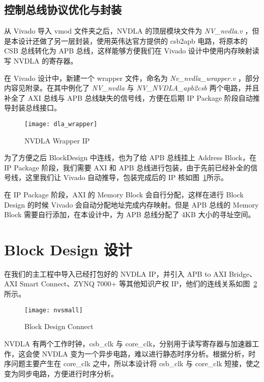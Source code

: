 \subsection{控制总线协议优化与封装}

从 Vivado 导入 vmod 文件夹之后，NVDLA 的顶层模块文件为 \emph{NV\_nvdla.v} ，但是本设计还做了另一层封装，使用英伟达官方提供的 csb2apb 电路，将原本的 CSB 总线转化为 APB 总线，这样能够方便我们在 Vivado 设计中使用内存映射读写 NVDLA 的寄存器。

在 Vivado 设计中，新建一个 wrapper 文件，命名为 \emph{Nv\_nvdla\_wrapper.v} ，部分内容见附录。在其中例化了 \emph{NV\_nvdla} 与 \emph{NV\_NVDLA\_apb2csb} 两个电路，并且补全了 AXI 总线与 APB 总线缺失的信号线，方便在后期 IP Package 阶段自动推导封装总线接口。

\begin{figure}[!htbp]
    \centering
    \texttt{[image: dla\_wrapper]}
    \caption{NVDLA Wrapper IP}
    \label{fig:NVDLA Wrapper}
\end{figure}

为了方便之后 BlockDesign 中连线，也为了给 APB 总线挂上 Address Block，在 IP Package 阶段，我们需要 AXI 和 APB 总线进行包装，由于先前已经补全的信号线，这里我们让 Vivado 自动推导，包装完成后的 IP 核如图~\ref{fig:NVDLA Wrapper}所示。

在 IP Package 阶段，AXI 的 Memory Block 会自行分配，这样在进行 Block Design 的时候 Vivado 会自动分配地址完成内存映射。但是 APB 总线的 Memory Block 需要自行添加，在本设计中，为 APB 总线分配了 4KB 大小的寻址空间。

\section{Block Design 设计}

在我们的主工程中导入已经打包好的 NVDLA IP，并引入 APB to AXI Bridge、AXI Smart Connect、ZYNQ 7000+ 等其他知识产权 IP，他们的连线关系如图~\ref{fig:Block Design Connect}所示。

\begin{figure}[!htbp]
    \centering
    \texttt{[image: nvsmall]}
    \caption{Block Design Connect}
    \label{fig:Block Design Connect}
\end{figure}

NVDLA 有两个工作时钟，csb\_clk 与 core\_clk，分别用于读写寄存器与加速器工作，这会使 NVDLA 变为一个异步电路，难以进行静态时序分析。根据分析，时序问题主要产生在 core\_clk 之中，所以本设计将 csb\_clk 与 core\_clk 短接，使之变为同步电路，方便进行时序分析。


